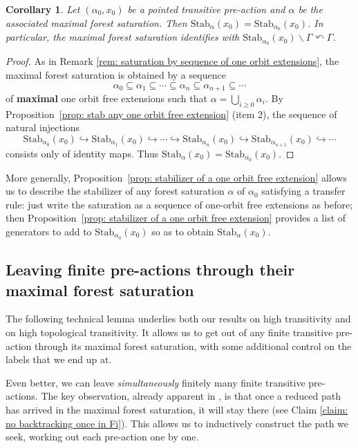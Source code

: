 \documentclass[12pt]{article}
\numberwithin{equation}{section}
\newtheorem{corollary}[equation]{Corollary}
\theoremstyle{definition}
\newcommand{\Stab}{\mathrm{Stab}}
\newcommand{\bs}{\backslash}
\begin{document}
    
	\begin{corollary}\label{cor: maximal forest sat stabilizer}
		Let $(\alpha_0, x_0)$ be a pointed transitive pre-action
		and \( \alpha \) be the associated maximal forest saturation.
		Then $\Stab_{\alpha}(x_0)=\Stab_{\alpha_0}(x_0)$. In particular, the maximal forest saturation identifies with $\Stab_{\alpha_0}(x_0)\bs \Gamma \curvearrowleft \Gamma$. 
	\end{corollary}
	\begin{proof} 
		As in Remark \ref{rem: saturation by sequence of one orbit extensions},
		the maximal forest saturation is obtained by a sequence
		\[
			\alpha_0 \subseteq \alpha_1 \subseteq \cdots \subseteq \alpha_n \subseteq \alpha_{n+1} \subseteq \cdots
		\]
		of \textbf{maximal} one orbit free extensions such that $\alpha = \bigcup_{i\geq 0} \alpha_i$.
		By Proposition~\ref{prop: stab any one orbit free extension} (item 2), the sequence of natural injections 
		\[\Stab_{\alpha_0}(x_0)\hookrightarrow \Stab_{\alpha_1}(x_0)\hookrightarrow \cdots \hookrightarrow \Stab_{\alpha_n}(x_0)\hookrightarrow \Stab_{\alpha_{n+1}}(x_0)\hookrightarrow \cdots\]
		consists only of identity maps. Thus $\Stab_{\alpha}(x_0)=\Stab_{\alpha_0}(x_0)$.
	\end{proof}

    More generally, Proposition~\ref{prop: stabilizer of a one orbit free extension}
    allows us to describe the stabilizer of any forest saturation $\alpha$ of $\alpha_0$ satisfying a transfer rule:
    just write the saturation as a sequence of one-orbit free extensions as before;
    then Proposition~\ref{prop: stabilizer of a one orbit free extension}
    provides a list of generators to add to \(\Stab_{\alpha_0}(x_0)\) so as to obtain \(\Stab_{\alpha}(x_0)\).


\subsection{Leaving finite pre-actions through their maximal forest saturation}


The following technical lemma underlies both our results 
on high transitivity and on high topological transitivity. 
It allows us to get out of any finite transitive pre-action
through its maximal forest saturation, with some 
additional control on the labels that we end up at.

Even better, we can leave \emph{simultaneously} finitely many
finite transitive pre-actions.
The key observation, already apparent in \cite[Claim~3.5]{moonHighlyTransitiveActions2013},
is that once  a reduced path has arrived in the maximal forest saturation,
it will stay there (see Claim \ref{claim: no backtracking once in Fi}).
This allows us to inductively construct the path we seek, working 
out each pre-action one by one.
\end{document}
